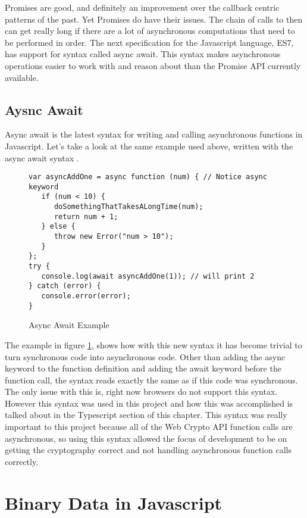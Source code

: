 Promises are good, and definitely an improvement over the callback centric patterns of the past. Yet Promises do have their issues. The chain of calls to then can get really long if there are a lot of asynchronous computations that need to be performed in order. The next specification for the Javascript language, ES7, has support for syntax called async await. This syntax makes asynchronous operations easier to work with and reason about than the Promise API currently available.


\subsection{Aysnc Await}


Async await is the latest syntax for writing and calling asynchronous functions in Javascript. Let's take a look at the same example used above, written with the async await syntax \cite{js-asyncawait}.

\begin{figure}[!htbp]
\centering
\begin{lstlisting}[basicstyle=\small]
var asyncAddOne = async function (num) { // Notice async keyword
   if (num < 10) {
      doSomethingThatTakesALongTime(num);
      return num + 1;
   } else {
      throw new Error("num > 10");
   }   
};   
try {
   console.log(await asyncAddOne(1)); // will print 2
} catch (error) {
   console.error(error);
}
\end{lstlisting}
\caption{Async Await Example}
\label{fig:asyncawait}
\end{figure}

The example in figure \ref{fig:asyncawait}, shows how with this new syntax it has become trivial to turn synchronous code into asynchronous code. Other than adding the async keyword to the function definition and adding the await keyword before the function call, the syntax reads exactly the same as if this code was synchronous. The only issue with this is, right now browsers do not support this syntax. However this syntax was used in this project and how this was accomplished is talked about in the Typescript section of this chapter. This syntax was really important to this project because all of the Web Crypto API function calls are asynchronous, so using this syntax allowed the focus of development to be on getting the cryptography correct and not handling asynchronous function calls correctly.


\section{Binary Data in Javascript}


